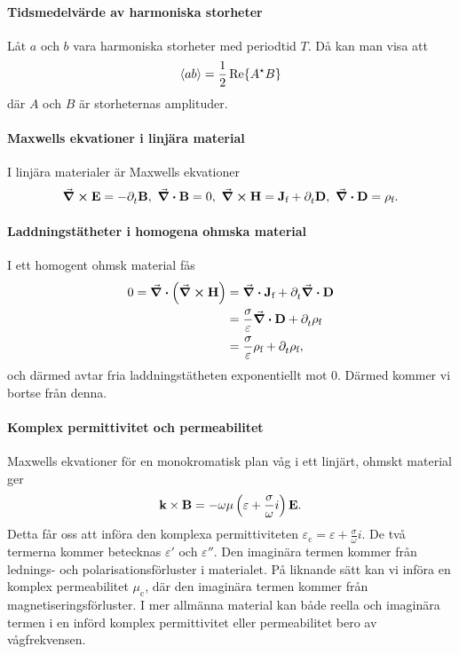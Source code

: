 \paragraph{Tidsmedelvärde av harmoniska storheter}
Låt $a$ och $b$ vara harmoniska storheter med periodtid $T$. Då kan man visa att
\begin{align*}
	\expval{ab} = \frac{1}{2}\Re{A^{\star}B}
\end{align*}
där $A$ och $B$ är storheternas amplituder.

\paragraph{Maxwells ekvationer i linjära material}
I linjära materialer är Maxwells ekvationer
\begin{align*}
	\curl{\vb{E}} = -\partial_{t}^{}\vb{B},\ \div{\vb{B}} = 0,\ \curl{\vb{H}} = \vb{J}_{\text{f}} + \partial_{t}^{}\vb{D},\ \div{\vb{D}} = \rho_{\text{f}}.
\end{align*}

\paragraph{Laddningstätheter i homogena ohmska material}
I ett homogent ohmsk material fås
\begin{align*}
	0 = \div(\curl{\vb{H}}) &= \div{\vb{J}_{\text{f}}} + \partial_{t}^{}\div{\vb{D}} \\
	                        &= \frac{\sigma}{\varepsilon}\div{\vb{D}} + \partial_{t}^{}\rho_{\text{f}} \\
	                        &= \frac{\sigma}{\varepsilon}\rho_{\text{f}} + \partial_{t}^{}\rho_{\text{f}},
\end{align*}
och därmed avtar fria laddningstätheten exponentiellt mot $0$. Därmed kommer vi bortse från denna.

\paragraph{Komplex permittivitet och permeabilitet}
Maxwells ekvationer för en monokromatisk plan våg i ett linjärt, ohmskt material ger
\begin{align*}
	\vb{k}\times\vb{B} = -\omega\mu\left(\varepsilon + \frac{\sigma}{\omega}i\right)\vb{E}.
\end{align*}
Detta får oss att införa den komplexa permittiviteten $\varepsilon_{\text{c}} = \varepsilon + \frac{\sigma}{\omega}i$. De två termerna kommer betecknas $\varepsilon'$ och $\varepsilon''$. Den imaginära termen kommer från lednings- och polarisationsförluster i materialet. På liknande sätt kan vi införa en komplex permeabilitet $\mu_{\text{c}}$, där den imaginära termen kommer från magnetiseringsförluster. I mer allmänna material kan både reella och imaginära termen i en införd komplex permittivitet eller permeabilitet bero av vågfrekvensen.

